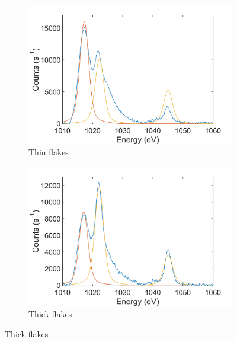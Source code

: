 \begin{figure}[!h]
	\begin{center}
		\begin{subfigure}[b]{0.4\textwidth}
			\includegraphics[width=\textwidth]{WSe2/WSe2XPSThinZn.png}
			\caption{Thin flakes}
			\label{fig:WSe2XPSThinZn}
		\end{subfigure}
		\qquad
		\begin{subfigure}[b]{0.4\textwidth}
			\includegraphics[width=\textwidth]{WSe2/WSe2XPSThickZn.png}
			\caption{Thick flakes}
			\label{fig:WSe2XPSThickZn}
		\end{subfigure}
		

\end{center}
\end{figure}
